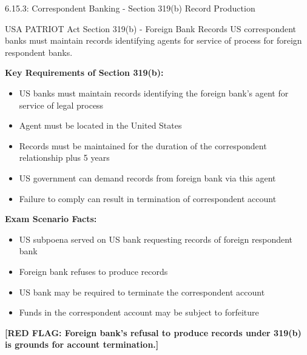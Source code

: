 \documentclass[11pt,a4paper]{beamer}
\newcommand{\redflag}[1]{\textcolor{red!80!black}{\textbf{[RED FLAG: #1]}}}
\begin{document}
\begin{frame}{6.15.3: Correspondent Banking - Section 319(b) Record Production}
	\begin{block}{USA PATRIOT Act Section 319(b) - Foreign Bank Records}
		US correspondent banks must maintain records identifying agents for service of process for foreign respondent banks.
	\end{block}
	\textbf{Key Requirements of Section 319(b):}
	\begin{itemize}
		\item US banks must maintain records identifying the foreign bank's agent for service of legal process
		\item Agent must be located in the United States
		\item Records must be maintained for the duration of the correspondent relationship plus 5 years
		\item US government can demand records from foreign bank via this agent
		\item Failure to comply can result in termination of correspondent account
	\end{itemize}
	\textbf{Exam Scenario Facts:}
	\begin{itemize}
		\item US subpoena served on US bank requesting records of foreign respondent bank
		\item Foreign bank refuses to produce records
		\item US bank may be required to terminate the correspondent account
		\item Funds in the correspondent account may be subject to forfeiture
	\end{itemize}
	\redflag{Foreign bank's refusal to produce records under 319(b) is grounds for account termination.}
\end{frame}
\end{document}
